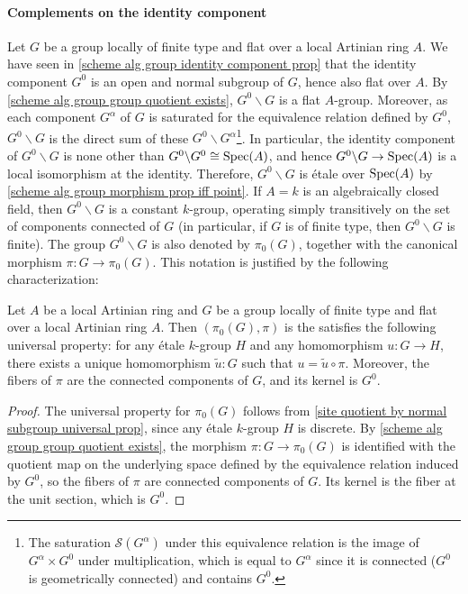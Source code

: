 \paragraph{Complements on the identity component}
Let $G$ be a group locally of finite type and flat over a local Artinian ring $A$. We have seen in \cref{scheme alg group identity component prop} that the identity component $G^0$ is an open and normal subgroup of $G$, hence also flat over $A$. By \cref{scheme alg group group quotient exists}, $G^0\backslash G$ is a flat $A$-group. Moreover, as each component $G^\alpha$ of $G$ is saturated for the equivalence relation defined by $G^0$, $G^0\backslash G$ is the direct sum of these $G^0\backslash G^\alpha$\footnote{The saturation $\mathcal{S}(G^\alpha)$ under this equivalence relation is the image of $G^\alpha\times G^0$ under multiplication, which is equal to $G^\alpha$ since it is connected ($G^0$ is geometrically connected) and contains $G^0$.}. In particular, the identity component of $G^0\backslash G$ is none other than $G^0\backslash G^0\cong\mathrm{Spec}(A)$, and hence $G^0\backslash G\to\mathrm{Spec}(A)$ is a local isomorphism at the identity. Therefore, $G^0\backslash G$ is \'etale over $\mathrm{Spec}(A)$ by \cref{scheme alg group morphism prop iff point}. If $A=k$ is an algebraically closed field, then $G^0\backslash G$ is a constant $k$-group, operating simply transitively on the set of components connected of $G$ (in particular, if $G$ is of finite type, then $G^0\backslash G$ is finite). The group $G^0\backslash G$ is also denoted by $\pi_0(G)$, together with the canonical morphism $\pi:G\to\pi_0(G)$. This notation is justified by the following characterization:

\begin{proposition}\label{scheme alg group pi_0 universal prop}
Let $A$ be a local Artinian ring and $G$ be a group locally of finite type and flat over a local Artinian ring $A$. Then $(\pi_0(G),\pi)$ is the satisfies the following universal property: for any \'etale $k$-group $H$ and any homomorphism $u:G\to H$, there exists a unique homomorphism $\tilde{u}:G$ such that $u=\tilde{u}\circ\pi$. Moreover, the fibers of $\pi$ are the connected components of $G$, and its kernel is $G^0$.
\end{proposition}
\begin{proof}
The universal property for $\pi_0(G)$ follows from \cref{site quotient by normal subgroup universal prop}, since any \'etale $k$-group $H$ is discrete. By \cref{scheme alg group group quotient exists}, the morphism $\pi:G\to\pi_0(G)$ is identified with the quotient map on the underlying space defined by the equivalence relation induced by $G^0$, so the fibers of $\pi$ are connected components of $G$. Its kernel is the fiber at the unit section, which is $G^0$.
\end{proof}

